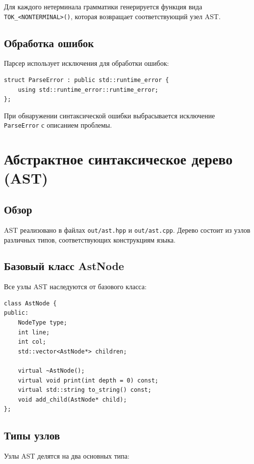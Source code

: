 \documentclass[12pt,a4paper]{article}
\begin{document}
Для каждого нетерминала грамматики генерируется функция вида \texttt{TOK\_<NONTERMINAL>()}, которая возвращает соответствующий узел AST.

\subsection{Обработка ошибок}

Парсер использует исключения для обработки ошибок:

\begin{lstlisting}
struct ParseError : public std::runtime_error {
    using std::runtime_error::runtime_error;
};
\end{lstlisting}

При обнаружении синтаксической ошибки выбрасывается исключение \texttt{ParseError} с описанием проблемы.

\section{Абстрактное синтаксическое дерево (AST)}

\subsection{Обзор}

AST реализовано в файлах \texttt{out/ast.hpp} и \texttt{out/ast.cpp}. Дерево состоит из узлов различных типов, соответствующих конструкциям языка.

\subsection{Базовый класс AstNode}

Все узлы AST наследуются от базового класса:

\begin{lstlisting}
class AstNode {
public:
    NodeType type;
    int line;
    int col;
    std::vector<AstNode*> children;
    
    virtual ~AstNode();
    virtual void print(int depth = 0) const;
    virtual std::string to_string() const;
    void add_child(AstNode* child);
};
\end{lstlisting}

\subsection{Типы узлов}

Узлы AST делятся на два основных типа:
\end{document}
